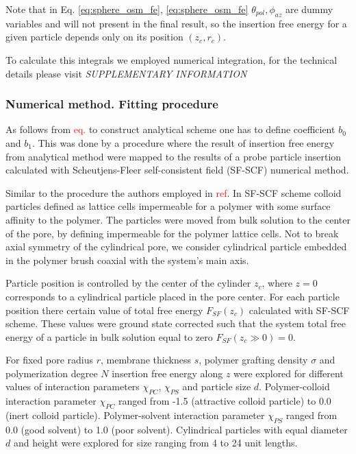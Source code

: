 \documentclass[12pt, a4paper]{article}
\newcommand\todo[1]{\textcolor{red}{#1}}
\begin{document}
Note that in Eq. \ref{eq:sphere_osm_fe}, \ref{eq:sphere_osm_fe}  $\theta_{pol}, \phi_{az}$ are dummy variables and will not present in the final result, so the insertion free energy for a given particle depends only on its position $(z_c, r_c)$.

To calculate this integrals we employed numerical integration, for the technical details please visit \emph{SUPPLEMENTARY INFORMATION}



\subsubsection*{Numerical method. Fitting procedure}
As follows from \todo{eq.} to construct analytical scheme one has to define coefficient $b_0$ and $b_1$.
This was done by a procedure where the result of insertion free energy from analytical method were mapped to the results of a probe particle insertion calculated with Scheutjens-Fleer self-consistent field (SF-SCF) numerical method.

Similar to the procedure the authors employed in \todo{ref}.
In SF-SCF scheme colloid particles defined as lattice cells impermeable for a polymer with some surface affinity to the polymer. 
The particles were moved from bulk solution to the center of the pore, by defining impermeable for the polymer lattice cells.
Not to break axial symmetry of the cylindrical pore, we consider cylindrical particle embedded in the polymer brush coaxial with the system's main axis.

Particle position is controlled by the center of the cylinder $z_c$, where $z=0$ corresponds to a cylindrical particle placed in the pore center.
For each particle position there certain value of total free energy $F_{SF}(z_c)$ calculated with SF-SCF scheme. These values were ground state corrected such that the system total free energy of a particle in bulk solution equal to zero $F_{SF}(z_c \gg 0) = 0$.

For fixed pore radius $r$, membrane thickness $s$, polymer grafting density $\sigma$ and polymerization degree $N$ insertion free energy along $z$ were explored for different values of interaction parameters $\chi_{PC}$, $\chi_{PS}$ and particle size $d$.
Polymer-colloid interaction parameter $\chi_{PC}$ ranged from -1.5 (attractive colloid particle) to 0.0 (inert colloid particle).
Polymer-solvent interaction parameter $\chi_{PS}$ ranged from 0.0 (good solvent) to 1.0 (poor solvent).
Cylindrical particles with equal diameter $d$ and height were explored for size ranging from 4 to 24 unit lengths.
\end{document}
